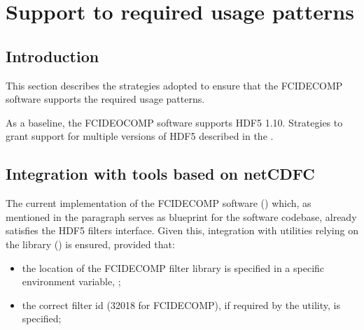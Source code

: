 \documentclass[a4paper,10pt,english]{sphinxmanual}
\begin{document}
\chapter{Support to required usage patterns}
\label{\detokenize{support_to_usage_patterns:support-to-required-usage-patterns}}\label{\detokenize{support_to_usage_patterns::doc}}

\section{Introduction}
\label{\detokenize{support_to_usage_patterns:introduction}}
\sphinxAtStartPar
This section describes the strategies adopted to ensure that the FCIDECOMP software supports the required usage
patterns.

\sphinxAtStartPar
{}

\sphinxAtStartPar
As a baseline, the FCIDEOCOMP software supports HDF5 1.10. Strategies to grant support for multiple versions of HDF5
described in the .


\section{Integration with tools based on netCDF\sphinxhyphen{}C}
\label{\detokenize{support_to_usage_patterns:integration-with-tools-based-on-netcdf-c}}
\sphinxAtStartPar
{}

\sphinxAtStartPar
The current implementation of the FCIDECOMP software ({\hyperref[\detokenize{introduction:fcidecomp-latest}]{}}) which, as mentioned in the
{\hyperref[\detokenize{canonical_repository:repository-initialization}]{}} paragraph serves as blueprint for the software codebase,
already satisfies the HDF5 filters interface. Given this, integration with utilities relying on the 
library ({\hyperref[\detokenize{introduction:netcdf-c}]{}}) is ensured, provided that:
\begin{itemize}
\item {} 
\sphinxAtStartPar
the location of the FCIDECOMP filter library is specified in a specific environment variable, ;

\item {} 
\sphinxAtStartPar
the correct filter id (32018 for FCIDECOMP), if required by the utility, is specified;

\end{itemize}
\end{document}
